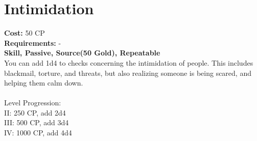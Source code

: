 \section{Intimidation}
\textbf{Cost:} 50 CP\\
\textbf{Requirements:} -\\
\textbf{Skill, Passive, Source(50 Gold), Repeatable}\\
You can add 1d4 to checks concerning the intimidation of people. This includes blackmail, torture, and threats, but also realizing someone is being scared, and helping them calm down.\\
\\
Level Progression:\\
II: 250 CP, add 2d4\\
III: 500 CP, add 3d4\\
IV: 1000 CP, add 4d4\\